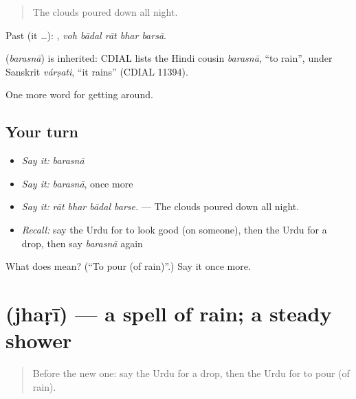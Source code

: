 \begin{quote}
The clouds poured down all night.
\end{quote}

Past (it …):     , \emph{voh bādal rāt bhar barsā}.

\begin{cousinweb}
\textbf{} (\emph{barasnā}) is inherited: CDIAL lists the Hindi cousin \emph{barasnā}, \textquotedblleft{}to rain\textquotedblright{}, under Sanskrit \emph{várṣati}, \textquotedblleft{}it rains\textquotedblright{} (CDIAL 11394).
\end{cousinweb}

\begin{grammarlens}[title={What you've built}]
One more word for getting around.
\end{grammarlens}

\subsection*{Your turn}
\begin{itemize}
\raggedright
  \item \emph{Say it:} \emph{barasnā}
  \item \emph{Say it:} \emph{barasnā}, once more
  \item \emph{Say it:} \emph{rāt bhar bādal barse.} — The clouds poured down all night.
  \item \emph{Recall:} say the Urdu for to look good (on someone), then the Urdu for a drop, then say \emph{barasnā} again
\end{itemize}

\begin{tcolorbox}[breakable,colback=teal!4,colframe=teal!35!black,title={Before you move on}]
What does  mean? (\textquotedblleft{}To pour (of rain)\textquotedblright{}.) Say it once more.
\end{tcolorbox}
\section[\texorpdfstring{\ur{جھڑی} (jhaṛī)}{جھڑی (jhaṛī)}]{ (jhaṛī) — a spell of rain; a steady shower}

\label{lesson:UR-C428-jhari}



\begin{quote}
Before the new one: say the Urdu for a drop, then the Urdu for to pour (of rain).
\end{quote}

